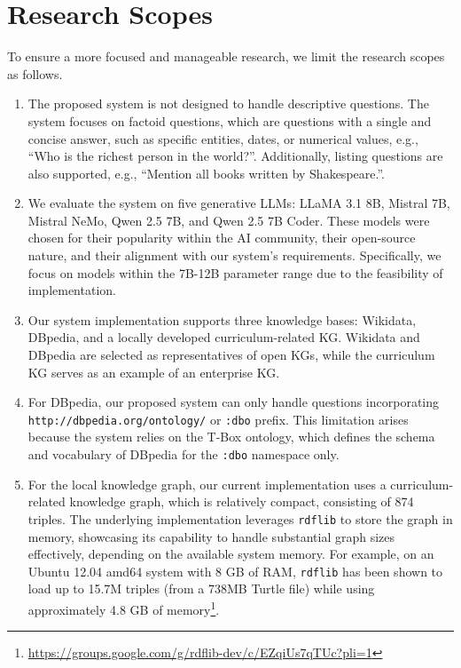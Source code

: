 \section{Research Scopes}
\label{sec:batasanPenelitian}
To ensure a more focused and manageable research, we limit the research scopes as follows.
\begin{enumerate}
    \item The proposed system is not designed to handle descriptive questions. The system focuses on factoid questions, which are questions with a single and concise answer, such as specific entities, dates, or numerical values, e.g., ``Who is the richest person in the world?''. Additionally, listing questions are also supported, e.g., ``Mention all books written by Shakespeare.''.
    \item We evaluate the system on five generative LLMs: LLaMA 3.1 8B, Mistral 7B, Mistral NeMo, Qwen 2.5 7B, and Qwen 2.5 7B Coder. These models were chosen for their popularity within the AI community, their open-source nature, and their alignment with our system's requirements. Specifically, we focus on models within the 7B-12B parameter range due to the feasibility of implementation. 
    \item Our system implementation supports three knowledge bases: Wikidata, DBpedia, and a locally developed curriculum-related KG. Wikidata and DBpedia are selected as representatives of open KGs, while the curriculum KG serves as an example of an enterprise KG.
    \item For DBpedia, our proposed system can only handle questions incorporating \texttt{http://dbpedia.org/ontology/} or \texttt{:dbo} prefix. This limitation arises because the system relies on the T-Box ontology, which defines the schema and vocabulary of DBpedia for the \texttt{:dbo} namespace only.
    \item For the local knowledge graph, our current implementation uses a curriculum-related knowledge graph, which is relatively compact, consisting of 874 triples. The underlying implementation leverages \texttt{rdflib} to store the graph in memory, showcasing its capability to handle substantial graph sizes effectively, depending on the available system memory. For example, on an Ubuntu 12.04 amd64 system with 8 GB of RAM, \texttt{rdflib} has been shown to load up to 15.7M triples (from a 738MB Turtle file) while using approximately 4.8 GB of memory\footnote{\url{https://groups.google.com/g/rdflib-dev/c/EZqiUs7qTUc?pli=1}}.
\end{enumerate}

